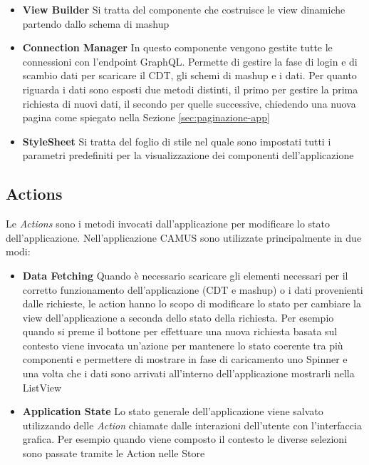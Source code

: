 \begin{itemize}
	\item \textbf{View Builder} Si tratta del componente che costruisce le view dinamiche partendo dallo schema di mashup
	\item \textbf{Connection Manager} In questo componente vengono gestite tutte le connessioni con l'endpoint GraphQL. Permette di gestire la fase di login e di scambio dati per scaricare il CDT, gli schemi di mashup e i dati. Per quanto riguarda i dati sono esposti due metodi distinti, il primo per gestire la prima richiesta di nuovi dati, il secondo per quelle successive, chiedendo una nuova pagina come spiegato nella Sezione \ref{sec:paginazione-app}
	\item \textbf{StyleSheet} Si tratta del foglio di stile nel quale sono impostati tutti i parametri predefiniti per la visualizzazione dei componenti dell'applicazione
\end{itemize}

\subsection{Actions}\label{sec:actions}
Le \emph{Actions} sono i metodi invocati dall'ap\-pli\-ca\-zio\-ne per modificare lo stato dell'applicazione. Nell'applicazione CAMUS sono utilizzate principalmente in due modi: 
\begin{itemize}
	\item \textbf{Data Fetching} Quando è necessario scaricare gli elementi necessari per il corretto funzionamento dell'applicazione (CDT e mashup) o i dati provenienti dalle richieste, le action hanno lo scopo di modificare lo stato per cambiare la view dell'applicazione a seconda dello stato della richiesta.
	Per esempio quando si preme il bottone per effettuare una nuova richiesta basata sul contesto viene invocata un'azione per mantenere lo stato coerente tra più componenti e permettere di mostrare in fase di caricamento uno Spinner e una volta che i dati sono arrivati all'interno dell'applicazione mostrarli nella ListView
	\item \textbf{Application State} Lo stato generale dell'applicazione viene salvato utilizzando delle \emph{Action} chiamate dalle interazioni dell'utente con l'interfaccia grafica. Per esempio quando viene composto il contesto le diverse selezioni sono passate tramite le Action nelle Store
\end{itemize}	

